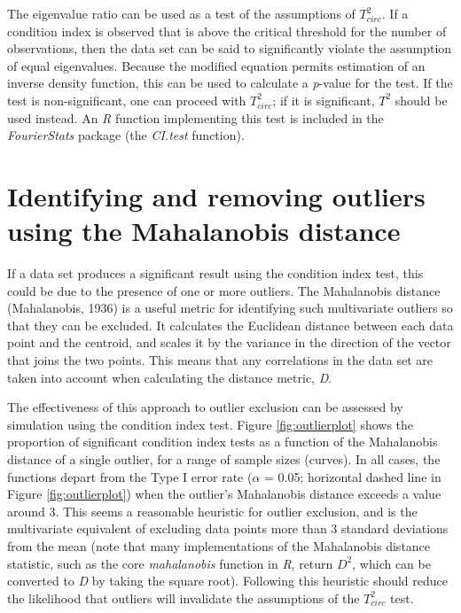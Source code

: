\documentclass[]{article}
\begin{document}
The eigenvalue ratio can be used as a test of the assumptions of \(T^2_{circ}\). If a condition index is observed that is above the critical threshold for the number of observations, then the data set can be said to significantly violate the assumption of equal eigenvalues. Because the modified equation permits estimation of an inverse density function, this can be used to calculate a \emph{p}-value for the test. If the test is non-significant, one can proceed with \(T^2_{circ}\); if it is significant, \(T^2\) should be used instead. An \emph{R} function implementing this test is included in the \emph{FourierStats} package (the \emph{CI.test} function).

\hypertarget{identifying-and-removing-outliers-using-the-mahalanobis-distance}{%
\section{Identifying and removing outliers using the Mahalanobis distance}\label{identifying-and-removing-outliers-using-the-mahalanobis-distance}}

If a data set produces a significant result using the condition index test, this could be due to the presence of one or more outliers. The Mahalanobis distance (Mahalanobis, 1936) is a useful metric for identifying such multivariate outliers so that they can be excluded. It calculates the Euclidean distance between each data point and the centroid, and scales it by the variance in the direction of the vector that joins the two points. This means that any correlations in the data set are taken into account when calculating the distance metric, \emph{D}.

The effectiveness of this approach to outlier exclusion can be assessed by simulation using the condition index test. Figure \ref{fig:outlierplot} shows the proportion of significant condition index tests as a function of the Mahalanobis distance of a single outlier, for a range of sample sizes (curves). In all cases, the functions depart from the Type I error rate (\(\alpha\) = 0.05; horizontal dashed line in Figure \ref{fig:outlierplot}) when the outlier's Mahalanobis distance exceeds a value around 3. This seems a reasonable heuristic for outlier exclusion, and is the multivariate equivalent of excluding data points more than 3 standard deviations from the mean (note that many implementations of the Mahalanobis distance statistic, such as the core \emph{mahalanobis} function in \emph{R}, return \(D^2\), which can be converted to \emph{D} by taking the square root). Following this heuristic should reduce the likelihood that outliers will invalidate the assumptions of the \(T^2_{circ}\) test.
\end{document}
